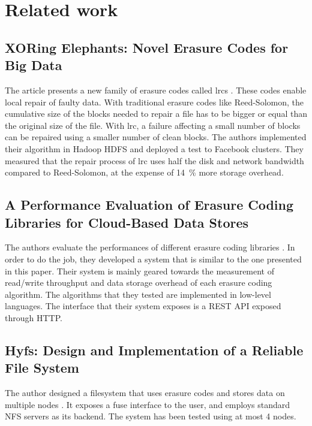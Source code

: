 \section{Related work}

\subsection{XORing Elephants: Novel Erasure Codes for Big Data}

The article presents a new family of erasure codes called \acp{lrc} \autocite{XorbasVLDB}.
These codes enable local repair of faulty data.
With traditional erasure codes like Reed-Solomon, the cumulative size of the blocks needed to repair a file has to be bigger or equal than the original size of the file.
With \ac{lrc}, a failure affecting a small number of blocks can be repaired using a smaller number of clean blocks.
The authors implemented their algorithm in Hadoop HDFS and deployed a test to Facebook clusters.
They measured that the repair process of \ac{lrc} uses half the disk and network bandwidth compared to Reed-Solomon, at the expense of \SI{14}{\percent} more storage overhead.

\subsection{A Performance Evaluation of Erasure Coding Libraries for Cloud-Based Data Stores}

The authors evaluate the performances of different erasure coding libraries \autocite{Burihabwa2016}.
In order to do the job, they developed a system that is similar to the one presented in this paper.
Their system is mainly geared towards the measurement of read/write throughput and data storage overhead of each erasure coding algorithm.
The algorithms that they tested are implemented in low-level languages.
The interface that their system exposes is a REST API exposed through HTTP.

\subsection{Hyfs: Design and Implementation of a Reliable File System}

The author designed a filesystem that uses erasure codes and stores data on multiple nodes \autocite{hyfs}.
It exposes a \ac{fuse} interface to the user, and employs standard NFS servers as its backend.
The system has been tested using at most 4 nodes.

